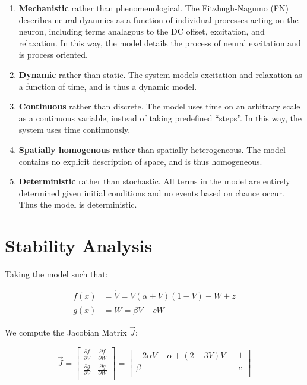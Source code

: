 \documentclass[11pt]{report}
\begin{document}
\begin{enumerate}
	\item \textbf{Mechanistic} rather than phenomenological. The Fitzhugh-Nagumo (FN) describes neural dyanmics as a function of individual processes acting on the neuron, including terms analagous to the DC offset, excitation, and relaxation. In this way, the model details the process of neural excitation and is process oriented.
	\item \textbf{Dynamic} rather than static. The system models excitation and relaxation as a function of time, and is thus a dynamic model.
	\item \textbf{Continuous} rather than discrete. The model uses time on an arbitrary scale as a continuous variable, instead of taking predefined ``steps''. In this way, the system uses time continuously. 
	\item \textbf{Spatially homogenous} rather than spatially heterogeneous. The model contains no explicit description of space, and is thus homogeneous. 
	\item \textbf{Deterministic} rather than stochastic. All terms in the model are entirely determined given initial conditions and no events based on chance occur. Thus the model is deterministic. 
\end{enumerate}

\section{Stability Analysis} %
\label{sub:stability_analysis}

Taking the model such that:

$$\begin{aligned}
f(x) &= \dot{V} = V(\alpha + V)(1-V) -W +z \\
g(x) &= \dot{W} = \beta V -cW
\end{aligned}
$$

We compute the Jacobian Matrix $\vec{J}$:


$$
\vec{J} = \begin{bmatrix}
    \frac{\partial f}{\partial{V}} & \frac{\partial f}{\partial{W}} \\
    \frac{\partial g}{\partial{V}} & \frac{\partial g}{\partial{W}} \\
\end{bmatrix} = 
\begin{bmatrix}
    −2\alpha V+\alpha+(2 - 3V)V & -1 \\
    \beta & -c \\
\end{bmatrix}
$$
\end{document}
